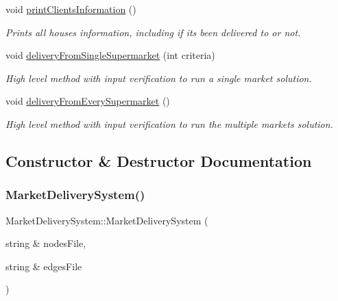 \begin{DoxyCompactItemize}
\hypertarget{class_market_delivery_system_a78105bc83f9bcdd0c96b8150c6d480c5}{}\label{class_market_delivery_system_a78105bc83f9bcdd0c96b8150c6d480c5} 
void \hyperlink{class_market_delivery_system_a78105bc83f9bcdd0c96b8150c6d480c5}{print\+Clients\+Information} ()
\begin{DoxyCompactList}\small\item\em Prints all house\textquotesingle{}s information, including if it\textquotesingle{}s been delivered to or not. \end{DoxyCompactList}\item 
void \hyperlink{class_market_delivery_system_a9abaef04e2482bc4b5d01a1d9f10ec68}{delivery\+From\+Single\+Supermarket} (int criteria)
\begin{DoxyCompactList}\small\item\em High level method with input verification to run a single market solution. \end{DoxyCompactList}\item 
\hypertarget{class_market_delivery_system_acee5f825bd0d5aaaf9c00e9c3ef8f4d6}{}\label{class_market_delivery_system_acee5f825bd0d5aaaf9c00e9c3ef8f4d6} 
void \hyperlink{class_market_delivery_system_acee5f825bd0d5aaaf9c00e9c3ef8f4d6}{delivery\+From\+Every\+Supermarket} ()
\begin{DoxyCompactList}\small\item\em High level method with input verification to run the multiple markets solution. \end{DoxyCompactList}\end{DoxyCompactItemize}


\subsection{Constructor \& Destructor Documentation}
\hypertarget{class_market_delivery_system_ad30257b3af92467a6fa6f4fea7ad4801}{}\label{class_market_delivery_system_ad30257b3af92467a6fa6f4fea7ad4801} 
\subsubsection{\texorpdfstring{Market\+Delivery\+System()}{MarketDeliverySystem()}}
{\footnotesize\ttfamily Market\+Delivery\+System\+::\+Market\+Delivery\+System (\begin{DoxyParamCaption}\item[{string \&}]{nodes\+File,  }\item[{string \&}]{edges\+File }\end{DoxyParamCaption})}



